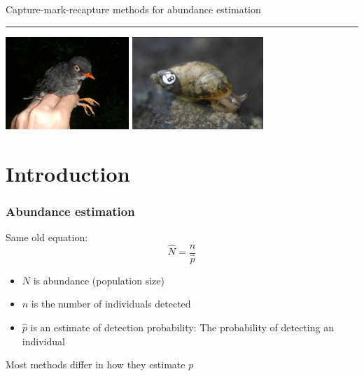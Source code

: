 \documentclass[color=usenames,dvipsnames]{beamer}\usepackage[]{graphicx}\usepackage[]{xcolor}
\begin{document}

\begin{frame}[plain]
  \begin{center}
    {\huge Capture-mark-recapture methods for abundance estimation \par}
    \vspace{0.5cm}
    {\color{RoyalBlue} \rule{\textwidth}{0.1pt}}
    \vfill
    \includegraphics[height=3.5cm,keepaspectratio]{figs/SBNT} %
    \hspace{0.5cm}
      \includegraphics[height=3.5cm,keepaspectratio]{figs/Novisuccinea_chittenangoensis_4}
  \end{center}
\end{frame}




\section{Introduction}


\begin{frame}
  \frametitle{Abundance estimation}
  \large
  Same old equation:
  \[
    \hat{N} = \frac{n}{\hat{p}}
  \]
  \begin{itemize}
    \item $N$ is abundance (population size)
    \item $n$ is the number of individuals detected
    \item $\hat{p}$ is an estimate of detection probability: The probability
      of detecting an individual
  \end{itemize}
  \pause
  \vfill
  \centering
  \Large %
  Most methods differ in how they estimate $p$ \\
\end{frame}
\end{document}
